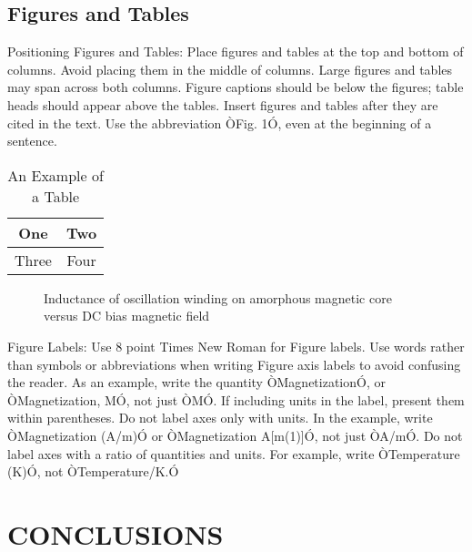 \documentclass[letterpaper, 10 pt,spanish, conference]{ieeeconf}  %
\begin{document}
\subsection{Figures and Tables}

Positioning Figures and Tables: Place figures and tables at the top and bottom of columns. Avoid placing them in the middle of columns. Large figures and tables may span across both columns. Figure captions should be below the figures; table heads should appear above the tables. Insert figures and tables after they are cited in the text. Use the abbreviation ÒFig. 1Ó, even at the beginning of a sentence.

\begin{table}[h]
\caption{An Example of a Table}
\label{table_example}
\begin{center}
\begin{tabular}{|c||c|}
\hline
One & Two\\
\hline
Three & Four\\
\hline
\end{tabular}
\end{center}
\end{table}


   \begin{figure}[thpb]
      \centering
      \caption{Inductance of oscillation winding on amorphous
       magnetic core versus DC bias magnetic field}
      \label{figurelabel}
   \end{figure}
   

Figure Labels: Use 8 point Times New Roman for Figure labels. Use words rather than symbols or abbreviations when writing Figure axis labels to avoid confusing the reader. As an example, write the quantity ÒMagnetizationÓ, or ÒMagnetization, MÓ, not just ÒMÓ. If including units in the label, present them within parentheses. Do not label axes only with units. In the example, write ÒMagnetization (A/m)Ó or ÒMagnetization {A[m(1)]}Ó, not just ÒA/mÓ. Do not label axes with a ratio of quantities and units. For example, write ÒTemperature (K)Ó, not ÒTemperature/K.Ó

\section{CONCLUSIONS}
\end{document}
